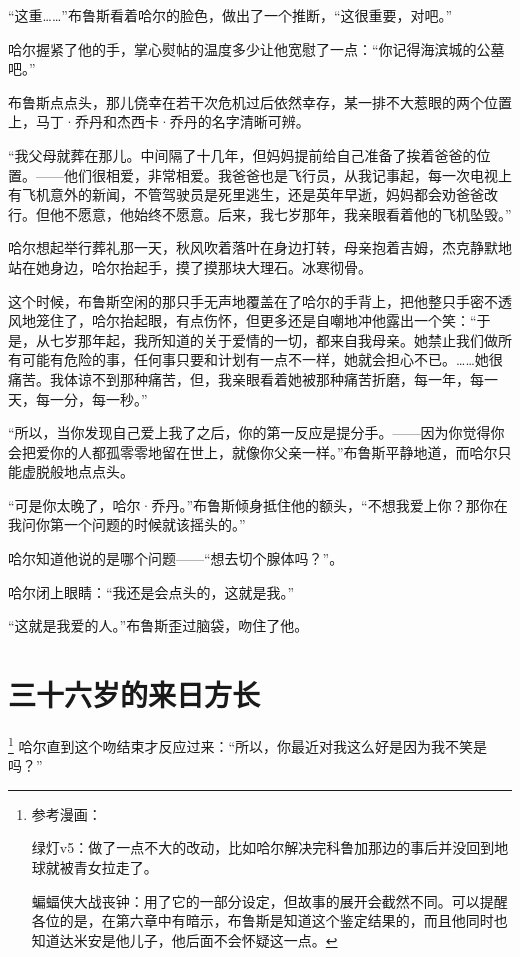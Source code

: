 \documentclass[../main]{subfiles}
\begin{document}
“这重……”布鲁斯看着哈尔的脸色，做出了一个推断，“这很重要，对吧。”

哈尔握紧了他的手，掌心熨帖的温度多少让他宽慰了一点：“你记得海滨城的公墓吧。”

布鲁斯点点头，那儿侥幸在若干次危机过后依然幸存，某一排不大惹眼的两个位置上，马丁·乔丹和杰西卡·乔丹的名字清晰可辨。

“我父母就葬在那儿。中间隔了十几年，但妈妈提前给自己准备了挨着爸爸的位置。——他们很相爱，非常相爱。我爸爸也是飞行员，从我记事起，每一次电视上有飞机意外的新闻，不管驾驶员是死里逃生，还是英年早逝，妈妈都会劝爸爸改行。但他不愿意，他始终不愿意。后来，我七岁那年，我亲眼看着他的飞机坠毁。”

哈尔想起举行葬礼那一天，秋风吹着落叶在身边打转，母亲抱着吉姆，杰克静默地站在她身边，哈尔抬起手，摸了摸那块大理石。冰寒彻骨。

这个时候，布鲁斯空闲的那只手无声地覆盖在了哈尔的手背上，把他整只手密不透风地笼住了，哈尔抬起眼，有点伤怀，但更多还是自嘲地冲他露出一个笑：“于是，从七岁那年起，我所知道的关于爱情的一切，都来自我母亲。她禁止我们做所有可能有危险的事，任何事只要和计划有一点不一样，她就会担心不已。……她很痛苦。我体谅不到那种痛苦，但，我亲眼看着她被那种痛苦折磨，每一年，每一天，每一分，每一秒。”

“所以，当你发现自己爱上我了之后，你的第一反应是提分手。——因为你觉得你会把爱你的人都孤零零地留在世上，就像你父亲一样。”布鲁斯平静地道，而哈尔只能虚脱般地点点头。

“可是你太晚了，哈尔·乔丹。”布鲁斯倾身抵住他的额头，“不想我爱上你？那你在我问你第一个问题的时候就该摇头的。”

哈尔知道他说的是哪个问题——“想去切个腺体吗？”。

哈尔闭上眼睛：“我还是会点头的，这就是我。”

“这就是我爱的人。”布鲁斯歪过脑袋，吻住了他。


\section{三十六岁的来日方长}

\footnote[1]{参考漫画：

    绿灯v5：做了一点不大的改动，比如哈尔解决完科鲁加那边的事后并没回到地球就被青女拉走了。

    蝙蝠侠大战丧钟：用了它的一部分设定，但故事的展开会截然不同。可以提醒各位的是，在第六章中有暗示，布鲁斯是知道这个鉴定结果的，而且他同时也知道达米安是他儿子，他后面不会怀疑这一点。}
哈尔直到这个吻结束才反应过来：“所以，你最近对我这么好是因为我不笑是吗？”
\end{document}
